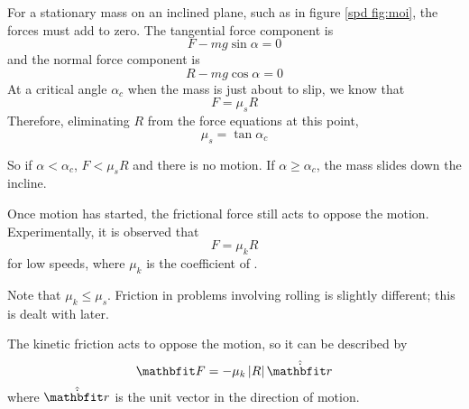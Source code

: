 \begin{example}
For a stationary mass on an inclined plane, such as in figure 
\ref{spd fig:moi}, the forces must add to zero.  The tangential force
component is
$$F-mg\sin\alpha=0$$
and the normal force component is
$$R-mg\cos\alpha=0$$
At a critical angle $\alpha_c$ when the mass is just about to slip, we know
that
$$F=\mu_s R$$
Therefore, eliminating $R$ from the force equations at this point,
$$\mu_s=\tan\alpha_c$$

So if $\alpha<\alpha_c$, $F<\mu_sR$ and there is no motion.  If $\alpha\geq
\alpha_c$, the mass slides down the incline.
\end{example}

Once motion has started, the frictional force still acts to oppose the
motion.  Experimentally, it is observed that
$$F=\mu_k R$$
for low speeds, where $\mu_k$ is the coefficient of .

Note that $\mu_k\leq\mu_s$.  Friction in problems involving rolling is
slightly different; this is dealt with later.

The kinetic friction acts to oppose the motion, so it can be described by
$$\vect{F}=-\mu_k\left|R\right|\hat{\dot{\vect{r}}}$$
where $\hat{\dot{\vect{r}}}$ is the unit vector in the direction of motion.


